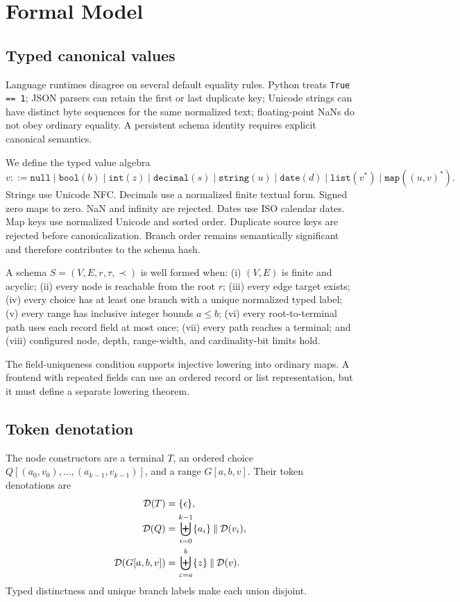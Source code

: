 \section{Formal Model}\label{sec:formal}
\subsection{Typed canonical values}
Language runtimes disagree on several default equality rules. Python treats \texttt{True == 1}; JSON parsers can retain the first or last duplicate key; Unicode strings can have distinct byte sequences for the same normalized text; floating-point NaNs do not obey ordinary equality. A persistent schema identity requires explicit canonical semantics.

We define the typed value algebra
\begin{equation}
 v ::= \texttt{null}\mid \texttt{bool}(b)\mid \texttt{int}(z)\mid
 \texttt{decimal}(s)\mid \texttt{string}(u)\mid \texttt{date}(d)
 \mid \texttt{list}(v^*)\mid \texttt{map}((u,v)^*).
\end{equation}
Strings use Unicode NFC. Decimals use a normalized finite textual form. Signed zero maps to zero. NaN and infinity are rejected. Dates use ISO calendar dates. Map keys use normalized Unicode and sorted order. Duplicate source keys are rejected before canonicalization. Branch order remains semantically significant and therefore contributes to the schema hash.

\begin{definition}
A schema \(S=(V,E,r,\tau,\prec)\) is well formed when: (i) \((V,E)\) is finite and acyclic; (ii) every node is reachable from the root \(r\); (iii) every edge target exists; (iv) every choice has at least one branch with a unique normalized typed label; (v) every range has inclusive integer bounds \(a\le b\); (vi) every root-to-terminal path uses each record field at most once; (vii) every path reaches a terminal; and (viii) configured node, depth, range-width, and cardinality-bit limits hold.
\end{definition}

The field-uniqueness condition supports injective lowering into ordinary maps. A frontend with repeated fields can use an ordered record or list representation, but it must define a separate lowering theorem.

\subsection{Token denotation}
The node constructors are a terminal \(T\), an ordered choice
\(Q[(a_0,v_0),\ldots,(a_{k-1},v_{k-1})]\), and a range \(G[a,b,v]\). Their token denotations are
\begin{align}
\mathcal{D}(T) &= \{\epsilon\},\\
\mathcal{D}(Q) &= \biguplus_{i=0}^{k-1} \{a_i\}\mathbin\Vert \mathcal{D}(v_i),\\
\mathcal{D}(G[a,b,v]) &= \biguplus_{z=a}^{b} \{z\}\mathbin\Vert \mathcal{D}(v).
\end{align}
Typed distinctness and unique branch labels make each union disjoint.

